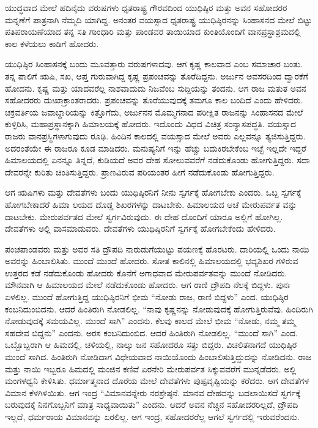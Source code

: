 ಯುದ್ಧವಾದ ಮೇಲೆ ಹದಿನೈದು ವರುಷಗಳು ಧೃತರಾಷ್ಟ್ರ ಗೌರವದಿಂದ ಯುಧಿಷ್ಠಿರ ಮತ್ತು ಅವನ ಸಹೋದರರ ಮನ್ನಣೆಗೆ ಪಾತ್ರನಾಗಿ ನೆಮ್ಮದಿ ಯಾಗಿದ್ದ. ಅನಂತರ ವಯಸ್ಸಾದ ಧೃತರಾಷ್ಟ್ರ ಯುಧಿಷ್ಠಿರನನ್ನು ಸಿಂಹಾಸನದ ಮೇಲೆ ಬಿಟ್ಟು ಪತಿಪರಾಯಣೆಯಾದ ತನ್ನ ಸತಿ ಗಾಂಧಾರಿ ಮತ್ತು ಪಾಂಡವರ ತಾಯಿಯಾದ ಕುಂತಿಯೊಂದಿಗೆ ವಾನಪ್ರಸ್ಥಾಶ್ರಮದಲ್ಲಿ ಕಾಲ ಕಳೆಯಲು ಕಾಡಿಗೆ ಹೋದರು.

ಯುಧಿಷ್ಠಿರ ಸಿಂಹಾಸನಕ್ಕೆ ಬಂದು ಮೂವತ್ತಾರು ವರುಷಗಳಾದವು. ಆಗ ಕೃಷ್ಣ ಕಾಲವಾದ ಎಂಬ ಸಮಾಚಾರ ಬಂತು. ತನ್ನ ಪಾಲಿಗೆ ಋಷಿ, ಸಖ, ಆಪ್ತ ಗುರುವಾಗಿದ್ದ ಕೃಷ್ಣ ಪ್ರಪಂಚವನ್ನು ತೊರೆದಿದ್ದನು. ಅರ್ಜುನ ಅವಸರದಿಂದ ದ್ವಾರಕೆಗೆ ಹೋದನು. ಕೃಷ್ಣ ಮತ್ತು ಯಾದವರೆಲ್ಲ ನಾಶವಾದುದು ನಿಜವೆಂಬ ಸುದ್ದಿಯನ್ನು ತಂದನು. ಆಗ ರಾಜ ಮತುತ ಅವನ ಸಹೋದರರು ದುಃಖಾಕ್ರಾಂತರಾದರು. ಪ್ರಪಂಚವನ್ನು ತೊರೆಯುವುದಕ್ಕೆ ತಮಗೂ ಕಾಲ ಬಂದಿದೆ ಎಂದು ಹೇಳಿದರು. ಚಕ್ರವರ್ತಿಯ ಜವಾಬ್ದಾರಿಯನ್ನು ಕಿತ್ತೊಗೆದು, ಅರ್ಜುನನ ಮೊಮ್ಮಗನಾದ ಪರೀಕ್ಷಿತ ರಾಜನನ್ನು ಸಿಂಹಾಸನದ ಮೇಲೆ ಕುಳ್ಳಿರಿಸಿ, ಮಹಾಪ್ರಸ್ಥಾನಕ್ಕಾಗಿ ಹಿಮಾಲಯಕ್ಕೆ ಹೋದರು. ಇದೊಂದು ವಿಧದ ವಿಚಿತ್ರ ಸಂನ್ಯಾಸಪದ್ಧತಿ. ವಯಸ್ಸಾದ ರಾಜರು ವಾನಪ್ರಸ್ಥಿಗಳಾಗುವುದು ರೂಢಿ. ಹಿಂದಿನ ಕಾಲದಲ್ಲಿ ವಯಸ್ಸಾದ ಮೇಲೆ ಅವರು ಎಲ್ಲವನ್ನೂ ತ್ಯಜಿಸುತ್ತಿದ್ದರು. ಅದರಂತೆಯೇ ಈ ರಾಜರೂ ಕೂಡ ಮಾಡಿದರು. ಮನುಷ್ಯನಿಗೆ ಇನ್ನು ಹೆಚ್ಚು ಬದುಕಿರಬೇಕೆಂಬ ಇಚ್ಛೆ ಇಲ್ಲದೇ ಇದ್ದರೆ ಹಿಮಾಲಯದಲ್ಲಿ ಏನನ್ನೂ ತಿನ್ನದೆ, ಕುಡಿಯದೆ ಅವರ ದೇಹ ಸೋಲುವವರೆಗೆ ನಡೆದುಕೊಂಡು ಹೋಗುತ್ತಿದ್ದರು. ಸದಾ ದೇವರನ್ನೇ ಕುರಿತು ಚಿಂತಿಸುತ್ತಿದ್ದರು. ಪ್ರಾಣವಿರುವ ಪರಿಯಂತರ ಹೀಗೆ ನಡೆದುಕೊಂಡು ಹೋಗುತ್ತಿದ್ದರು.

ಆಗ ಋಷಿಗಳು ಮತ್ತು ದೇವತೆಗಳು ಬಂದು ಯುಧಿಷ್ಠಿರನಿಗೆ ನೀನು ಸ್ವರ್ಗಕ್ಕೆ ಹೋಗಬೇಕು ಎಂದರು. ಒಬ್ಬ ಸ್ವರ್ಗಕ್ಕೆ ಹೋಗಬೇಕಾದರೆ ಹಿಮಾ ಲಯದ ದೊಡ್ಡ ಶಿಖರಗಳನ್ನು ದಾಟಬೇಕು. ಹಿಮಾಲಯದ ಆಚೆ ಮೇರುಪರ್ವತ ವನ್ನು ದಾಟಬೇಕು. ಮೇರುಪರ್ವತದ ಮೇಲೆ ಸ್ವರ್ಗವಿರುವುದು. ಈ ದೇಹ ದೊಂದಿಗೆ ಯಾರೂ ಅಲ್ಲಿಗೆ ಹೋಗಿಲ್ಲ. ದೇವತೆಗಳು ಅಲ್ಲಿ ವಾಸಮಾಡುವರು. ದೇವತೆಗಳು ಯುಧಿಷ್ಠಿರನಿಗೆ ಸ್ವರ್ಗಕ್ಕೆ ಹೋಗಬೇಕೆಂದು ಹೇಳಿದರು.

ಪಂಚಪಾಂಡವರು ಮತ್ತು ಅವರ ಸತಿ ದ್ರೌಪದಿ ನಾರುಡುಗೆಯುಟ್ಟು ಪಯಣಕ್ಕೆ ಹೊರಟರು. ದಾರಿಯಲ್ಲಿ ಒಂದು ನಾಯಿ ಅವರನ್ನು ಹಿಂಬಾಲಿಸಿತು. ಮುಂದೆ ಮುಂದೆ ಹೋದರು. ಸೋತ ಕಾಲಿನಲ್ಲಿ ಹಿಮಾಲಯದಲ್ಲಿ ಭವ್ಯಶಿಖರ ಗಳಿರುವ ಉತ್ತರದ ಕಡೆ ನಡೆದುಕೊಂಡು ಹೋದರು ಕೊನೆಗೆ ಅಗಾಧವಾದ ಮೇರುಪರ್ವತವನ್ನು ಮುಂದೆ ನೋಡಿದರು. ಮೌನವಾಗಿ ಆ ಹಿಮಾಲಯದ ಮೇಲೆ ನಡೆದುಕೊಂಡು ಹೋದರು. ಆಗ ರಾಣಿ ದ್ರೌಪದಿ ನೆಲಕ್ಕೆ ಬಿದ್ದಳು. ಪುನಃ ಏಳಲಿಲ್ಲ. ಮುಂದೆ ಹೋಗುತ್ತಿದ್ದ ಯುಧಿಷ್ಠಿರನಿಗೆ ಭೀಮ “ನೋಡು ರಾಜ, ರಾಣಿ ಬಿದ್ದಳು” ಎಂದ. ಯುಧಿಷ್ಠಿರ ಕಂಬನಿದುಂಬಿದನು. ಆದರೆ ಹಿಂತಿರುಗಿ ನೋಡಲಿಲ್ಲ. “ನಾವು ಕೃಷ್ಣನನ್ನು ನೋಡುವುದಕ್ಕೆ ಹೋಗುತ್ತಿರುವೆವು. ಹಿಂದಿರುಗಿ ನೋಡುವುದಕ್ಕೆ ಸಮಯವಿಲ್ಲ. ಮುಂದೆ ಸಾಗಿ” ಎಂದನು. ಕೆಲವು ಕಾಲದ ಮೇಲೆ ಭೀಮ “ನೋಡು, ನಮ್ಮ ತಮ್ಮ ಸಹದೇವ ಬಿದ್ದನು” ಎಂದನು. ಅರಸ ಕಂಬನಿದುಂಬಿದ. ಆದರೆ ಹಿಂತಿರುಗಿ ನೋಡಲಿಲ್ಲ. “ಮುಂದೆ ಸಾಗಿ” ಎಂದ. ಒಬ್ಬೊಬ್ಬರಾಗಿ ಆ ಹಿಮದಲ್ಲಿ, ಚಳಿಯಲ್ಲಿ, ನಾಲ್ಕು ಜನ ಸಹೋದರೂ ಸತ್ತು ಬಿದ್ದರು. ವಿಚಲಿತನಾಗದೆ ಯುಧಿಷ್ಠಿರ ಮುಂದೆ ಸಾಗಿದ. ಹಿಂತಿರುಗಿ ನೋಡಿದಾಗ ವಿಧೇಯವಾದ ನಾಯಿಯೊಂದು ಹಿಂಬಾಲಿಸುತ್ತಿದ್ದುದನ್ನು ನೋಡಿದನು. ರಾಜ ಮತ್ತು ನಾಯಿ ಇಬ್ಬರೂ ಹಿಮದಲ್ಲಿ ಮಂಜಿನ ಕಣಿವೆ ಏರನೇರಿ ಮೇರುಪರ್ವತ ಸಿಕ್ಕುವವರೆಗೆ ಮುನ್ನಡೆದರು. ಅಲ್ಲಿ ಮಂಗಳಧ್ವನಿ ಕೇಳಿಸಿತು. ಧರ್ಮಾತ್ಮನಾದ ದೊರೆಯ ಮೇಲೆ ದೇವತೆಗಳು ಪುಷ್ಪವೃಷ್ಟಿಯನ್ನು ಕರೆದರು. ಆಗ ದೇವತೆಗಳ ವಿಮಾನ ಕೆಳಗಿಳಿಯಿತು. ಆಗ ಇಂದ್ರ “ವಿಮಾನವನ್ನೇರು ನರಶ್ರೇಷ್ಠನೆ. ಮಾನವ ದೇಹವನ್ನು ಬದಲಾಯಿಸದೆ ಸ್ವರ್ಗಕ್ಕೆ ಬರುವುದಕ್ಕೆ ನಿನಗೊಬ್ಬನಿಗೆ ಮಾತ್ರ ಸಾಧ್ಯವಾಯಿತು” ಎಂದನು. ಆದರೆ ಅವನ ನೆಚ್ಚಿನ ಸಹೋದರರಿಲ್ಲದೆ, ದ್ರೌಪದಿ ಇಲ್ಲದೆ, ಧರ್ಮರಾಯ ವಿಮಾನವನ್ನು ಏರಲಿಲ್ಲ. ಆಗ ಇಂದ್ರ, ಸಹೋದರರೆಲ್ಲ ಆಗಲೆ ಸ್ವರ್ಗದಲ್ಲಿ ಇರುವರೆಂದನು.

